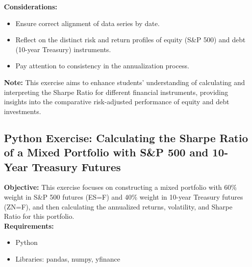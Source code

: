 \documentclass{article}
\begin{document}
\textbf{Considerations:}
\begin{itemize}
    \item Ensure correct alignment of data series by date.
    \item Reflect on the distinct risk and return profiles of equity (S\&P 500) and debt (10-year Treasury) instruments.
    \item Pay attention to consistency in the annualization process.
\end{itemize}

\textbf{Note:} This exercise aims to enhance students' understanding of calculating and interpreting the Sharpe Ratio for different financial instruments, providing insights into the comparative risk-adjusted performance of equity and debt investments.

\subsection{Python Exercise: Calculating the Sharpe Ratio of a Mixed Portfolio with S\&P 500 and 10-Year Treasury Futures}

\textbf{Objective:} This exercise focuses on constructing a mixed portfolio with 60\% weight in S\&P 500 futures (ES=F) and 40\% weight in 10-year Treasury futures (ZN=F), and then calculating the annualized returns, volatility, and Sharpe Ratio for this portfolio. \\

\textbf{Requirements:}
\begin{itemize}
    \item Python
    \item Libraries: pandas, numpy, yfinance
\end{itemize}
\end{document}
